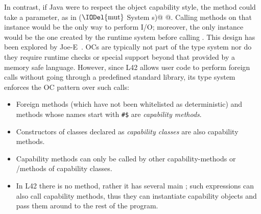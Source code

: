 In contrast, if Java were to respect the object capability style, the \Q@main@ method could take a \Q@System@ parameter, as in
 \Q@main($\text{\IODel{mut}}$ System s)@
 \lstset{language=Java}
@. \lstset{language=FortyTwo}%
Calling methods on that \Q@System@ instance would be the only way to perform I/O;
moreover, the only \Q@System@ instance would be the one created by the runtime system before calling \Q@main@. %
This design has been explored by Joe-E~\cite{finifter2008verifiable}.
OCs are typically not part of the type system nor do they require runtime checks or special support beyond that provided by a memory safe language. However, since
L42 allows user code to perform foreign calls without going through a predefined standard library, its type system enforces the OC pattern over such calls:
\begin{itemize}
\item Foreign methods (which have not been whitelisted as deterministic) and methods whose names start with \texttt{\#\$} are \emph{capability methods}.%
\item Constructors of classes declared as \emph{capability classes} are also capability methods.
\item Capability methods can only be called by other capability-methods or \Q@mut@/\Q@capsule@ methods of capability classes.
\item In L42 there is no \Q@main@ method, rather it has several main  ; such expressions can also call capability methods, thus they can instantiate capability objects and pass them around to the rest of the program.

\end{itemize}

